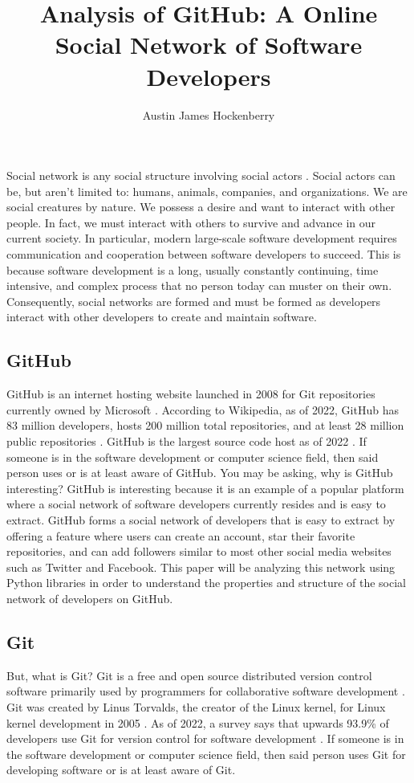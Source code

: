 \documentclass[9pt,twocolumn,twoside]{pnas-new}
\title{Analysis of GitHub: A Online Social Network of Software Developers}
\author[a,1]{Austin James Hockenberry}
\affil[a]{Undergraduate Student at the State University of New York at Buffalo}
\begin{document}
\maketitle
\thispagestyle{firststyle}

 Social network is any social structure involving social actors \cite{wikipediasocialnetwork}. Social actors can be, but aren't limited to: humans, animals, companies, and organizations. We are social creatures by nature. We possess a desire and want to interact with other people. In fact, we must interact with others to survive and advance in our current society. In particular, modern large-scale software development requires communication and cooperation between software developers to succeed. This is because software development is a long, usually constantly continuing, time intensive, and complex process that no person today can muster on their own. Consequently, social networks are formed and must be formed as developers interact with other developers to create and maintain software.

\subsection{GitHub} GitHub is an internet hosting website launched in 2008 for Git repositories currently owned by Microsoft \cite{wikipediagithub}. According to Wikipedia, as of 2022, GitHub has 83 million developers, hosts 200 million total repositories, and at least 28 million public repositories \cite{wikipediagithub}. GitHub is the largest source code host as of 2022 \cite{wikipediagithub}. If someone is in the software development or computer science field, then said person uses or is at least aware of GitHub. You may be asking, why is GitHub interesting? GitHub is interesting because it is an example of a popular platform where a social network of software developers currently resides and is easy to extract. GitHub forms a social network of developers that is easy to extract by offering a feature where users can create an account, star their favorite repositories, and can add followers similar to most other social media websites such as Twitter and Facebook. This paper will be analyzing this network using Python libraries in order to understand the properties and structure of the social network of developers on GitHub.

\subsection{Git} But, what is Git? Git is a free and open source distributed version control software primarily used by programmers for collaborative software development \cite{wikipediagit}. Git was created by Linus Torvalds, the creator of the Linux kernel, for Linux kernel development in 2005 \cite{wikipediagit}. As of 2022, a survey says that upwards 93.9\% of developers use Git for version control for software development \cite{wikipediagit}. If someone is in the software development or computer science field, then said person uses Git for developing software or is at least aware of Git.
\end{document}
